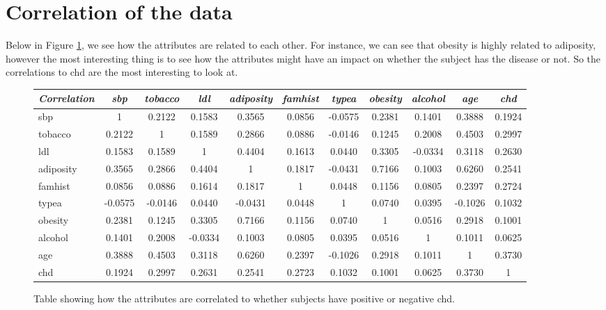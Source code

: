 \section{Correlation of the data}

Below in Figure \ref{correlationTable}, we see how the attributes are related to each other. For instance, we can see that obesity is highly related to adiposity, however the most interesting thing is to see how the attributes might have an impact on whether the subject has the disease or not. So the correlations to chd are the most interesting to look at.

\begin{figure}[H]
\begin{longtable}{ l c c c c c c c c c c}
  \hline                        
  \emph{Correlation} &  \emph{sbp} &  \emph{tobacco} &  \emph{ldl} &  \emph{adiposity} &  \emph{famhist} &  \emph{typea} &  \emph{obesity} &  \emph{alcohol} &  \emph{age} &  \emph{chd}	\\ \hline
sbp & 1 & 0.2122 & 0.1583 & 0.3565 &  0.0856 & -0.0575 &
   0.2381 & 0.1401 &  0.3888 & 0.1924 \\ 
   
 tobacco & 0.2122 & 1 & 0.1589 &  0.2866 &  0.0886 & -0.0146 &
   0.1245 &  0.2008 & 0.4503 &  0.2997 \\ 
   
ldl & 0.1583 & 0.1589 &  1 &          0.4404 &  0.1613 &  0.0440 &
   0.3305 &  -0.0334 &   0.3118 & 0.2630 \\ 

adiposity &  0.3565 & 0.2866 & 0.4404 & 1 &          0.1817 & -0.0431
 &  0.7166 &  0.1003 &  0.6260 & 0.2541 \\ 

famhist & 0.0856 & 0.0886 &  0.1614 &  0.1817 &  1      &    0.0448 &
   0.1156 & 0.0805 &  0.2397 &  0.2724 \\ 

typea & -0.0575 & -0.0146 &  0.0440 & -0.0431 &  0.0448 &  1 &
   0.0740 &   0.0395 & -0.1026 &  0.1032 \\ 

obesity & 0.2381 &  0.1245 &  0.3305 &  0.7166 &  0.1156 &  0.0740 &
   1 &          0.0516 &  0.2918 &  0.1001 \\ 

alcohol & 0.1401 & 0.2008 & -0.0334 &   0.1003 &  0.0805 &  0.0395 &
   0.0516 &  1 &          0.1011 &  0.0625 \\ 

age & 0.3888 &  0.4503 &  0.3118 &  0.6260 & 0.2397 & -0.1026 &
   0.2918 &  0.1011 &  1     &     0.3730  \\ 
  
chd &  0.1924 & 0.2997 & 0.2631 & 0.2541 & 0.2723 & 0.1032 & 0.1001 & 0.0625 & 0.3730 & 1 \\ \hline
\end{longtable}
\caption{Table showing how the attributes are correlated to whether subjects have positive or negative chd.}
\label{correlationTable}
\end{figure}


